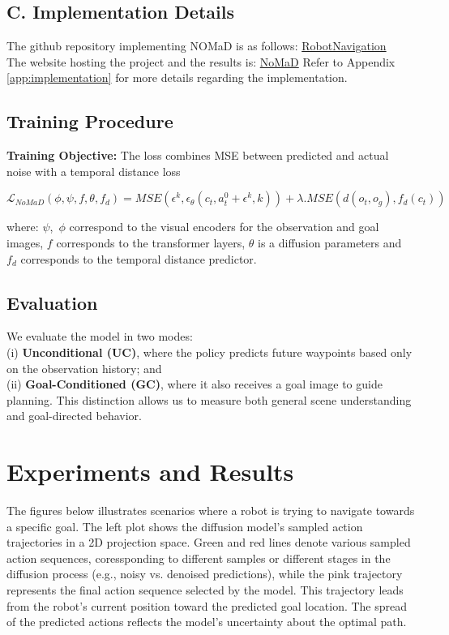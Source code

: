 \documentclass[12pt]{article}
\begin{document}
\subsection*{C. Implementation Details}
The github repository implementing NOMaD is as follows: \href{https://github.com/ishobhnik/RobotNavigation}{RobotNavigation}\\
The website hosting the project and the results is: \href{https://nomad-fawn.vercel.app/}{NoMaD}
Refer to Appendix \ref{app:implementation} for more details regarding the implementation.
\subsection{Training Procedure}
\textbf{Training Objective:} The loss combines MSE between predicted and actual noise with a temporal distance loss
\begin{center} \[ \mathcal{L}_{NoMaD}(\phi,\psi,f,\theta,f_d) = MSE(\epsilon^{k}, \epsilon_{\theta}(c_t, a^{0}_t + \epsilon^{k},k)) + \lambda .MSE(d(o_t, o_g), f_{d}(c_t))\] \end{center}
where: $\psi$,\ $\phi$ correspond to the visual encoders for the observation and goal images, $f$ corresponds to the transformer layers, $\theta$ is a diffusion parameters and $f_d$ corresponds to the temporal distance predictor.

\subsection{Evaluation}
We evaluate the model in two modes:\\ 
(i) \textbf{Unconditional (UC)}, where the policy predicts future waypoints based only on the observation history; and \\
(ii) \textbf{Goal-Conditioned (GC)}, where it also receives a goal image to guide planning. This distinction allows us to measure both general scene understanding and goal-directed behavior.
\section{Experiments and Results}
The figures below illustrates scenarios where a robot is trying to navigate towards a specific goal. The left plot shows the diffusion model's sampled action trajectories in a 2D projection space. Green and red lines denote various sampled action sequences, coressponding to different samples or different stages in the diffusion process (e.g., noisy vs. denoised predictions), while the pink trajectory represents the final action sequence selected by the model. This trajectory leads from the robot's current position toward the predicted goal location.  The spread of the predicted actions reflects the model's uncertainty about the optimal path.
\end{document}
